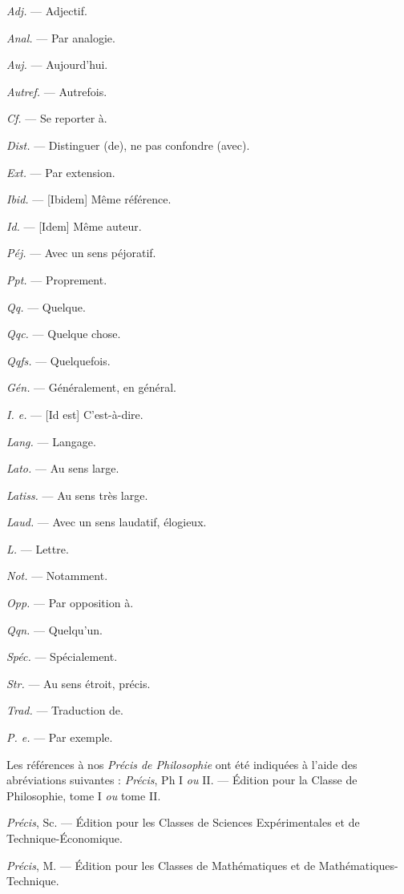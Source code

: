 \begin{minipage}[c]{.45\linewidth}
{\it Adj.} — Adjectif.

{\it Anal.} — Par analogie.

{\it Auj.} — Aujourd'hui.

{\it Autref.} — Autrefois.

{\it Cf.} — Se reporter à.

{\it Dist.} — Distinguer (de), ne pas confondre (avec).

{\it Ext.} — Par extension.

{\it Ibid.} — [{\it }Ibidem] Même référence.

{\it Id.} — [{\it }Idem] Même auteur.

{\it Péj.} — Avec un sens péjoratif.

{\it Ppt.} — Proprement.

{\it Qq.} — Quelque.

{\it Qqc.} — Quelque chose.

{\it Qqfs.} — Quelquefois.
\end{minipage}
\hfill
\begin{minipage}[c]{.45\linewidth}
{\it Gén.} — Généralement, en général.

{\it I. e.} — [{\it }Id est] C'est-à-dire.

{\it Lang.} — Langage.

{\it Lato.} — Au sens large.

{\it Latiss.} — Au sens très large.

{\it Laud.} — Avec un sens laudatif, élogieux.

{\it L.} — Lettre.

{\it Not.} — Notamment.

{\it Opp.} — Par opposition à.

{\it Qqn.} — Quelqu'un.

{\it Spéc.} — Spécialement.

{\it Str.} — Au sens étroit, précis.

{\it Trad.} — Traduction de.

{\it P. e.} — Par exemple.

\end{minipage}

\vspace{0.211cm}
Les références à nos {\it Précis de Philosophie} ont été indiquées à l’aide des
abréviations suivantes :
{\it Précis}, Ph I {\it ou} II. — Édition pour la Classe de Philosophie, tome I {\it ou} tome II.

{\it Précis}, Sc. — Édition pour les Classes de Sciences Expérimentales et de
Technique-Économique.

{\it Précis}, M. — Édition pour les Classes de Mathématiques et de
Mathématiques-Technique.

